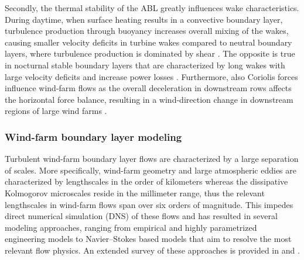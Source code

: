Secondly, the thermal stability of the ABL greatly influences wake characteristics. During daytime, when surface heating results in a convective boundary layer, turbulence production through buoyancy increases overall mixing of the wakes, causing smaller velocity deficits in turbine wakes compared to neutral boundary layers, where turbulence production is dominated by shear \citep{zhang2013wind,abkar2015influence}. The opposite is true in nocturnal stable boundary layers that are characterized by long wakes with large velocity deficits and increase power losses \citep{barthelmie2010evaluation,dorenkamper}. Furthermore, also Coriolis forces influence wind-farm flows as the overall deceleration in downstream rows affects the horizontal force balance, resulting in a wind-direction change in downstream regions of large wind farms \citep{dorenkamper, allaerts2017boundary, van2017coriolis}.


\subsubsection{Wind-farm boundary layer modeling}
Turbulent wind-farm boundary layer flows are characterized by a large separation of scales. More specifically, wind-farm geometry and large atmospheric eddies are characterized by lengthscales in the order of kilometers whereas the dissipative Kolmogorov microscales reside in the millimeter range, thus the relevant lengthscales in wind-farm flows span over six orders of magnitude. This impedes direct numerical simulation (DNS) of these flows and has resulted in several modeling approaches, ranging from empirical and highly parametrized engineering models to Navier--Stokes based models that aim to resolve the most relevant flow physics. An extended survey of these approaches is provided in \cite{crespo1999survey} and \cite{sanderse2011review}. 

